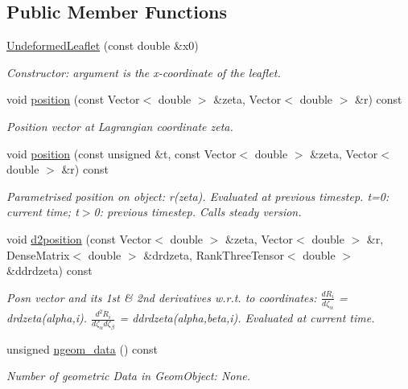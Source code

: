 \subsection*{Public Member Functions}
\begin{DoxyCompactItemize}
\item 
\hyperlink{classUndeformedLeaflet_ac4c0478b1f329360684af14b59043b12}{Undeformed\+Leaflet} (const double \&x0)
\begin{DoxyCompactList}\small\item\em Constructor\+: argument is the x-\/coordinate of the leaflet. \end{DoxyCompactList}\item 
void \hyperlink{classUndeformedLeaflet_a8e9b79702eb9a38e19886b84aeb47918}{position} (const Vector$<$ double $>$ \&zeta, Vector$<$ double $>$ \&r) const
\begin{DoxyCompactList}\small\item\em Position vector at Lagrangian coordinate zeta. \end{DoxyCompactList}\item 
void \hyperlink{classUndeformedLeaflet_a6949784da1030dd63ef741d170ef9798}{position} (const unsigned \&t, const Vector$<$ double $>$ \&zeta, Vector$<$ double $>$ \&r) const
\begin{DoxyCompactList}\small\item\em Parametrised position on object\+: r(zeta). Evaluated at previous timestep. t=0\+: current time; t$>$0\+: previous timestep. Calls steady version. \end{DoxyCompactList}\item 
void \hyperlink{classUndeformedLeaflet_a47d674756ce22e00a44ca0bd030a99da}{d2position} (const Vector$<$ double $>$ \&zeta, Vector$<$ double $>$ \&r, Dense\+Matrix$<$ double $>$ \&drdzeta, Rank\+Three\+Tensor$<$ double $>$ \&ddrdzeta) const
\begin{DoxyCompactList}\small\item\em Posn vector and its 1st \& 2nd derivatives w.\+r.\+t. to coordinates\+: $ \frac{dR_i}{d \zeta_\alpha}$ = drdzeta(alpha,i). $ \frac{d^2R_i}{d \zeta_\alpha d \zeta_\beta}$ = ddrdzeta(alpha,beta,i). Evaluated at current time. \end{DoxyCompactList}\item 
unsigned \hyperlink{classUndeformedLeaflet_a56153a1d117dd41657183655de094d3e}{ngeom\+\_\+data} () const
\begin{DoxyCompactList}\small\item\em Number of geometric Data in Geom\+Object\+: None. \end{DoxyCompactList}\end{DoxyCompactItemize}
